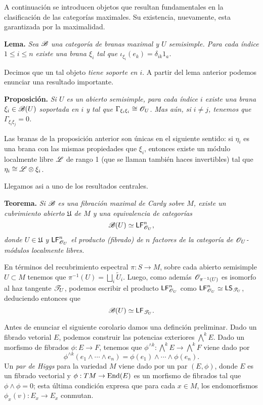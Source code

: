 {A continuaci\'on se introducen objetos que resultan fundamentales en la clasificaci\'on de las categor\'ias maximales. Su existencia, nuevamente, esta garantizada por la maximalidad.
\medskip

{\bf Lema.} {\it Sea $\mathscr{B}$ una categor\'ia de branas maximal y $U$ semisimple. Para cada \'indice $1\leqslant i \leqslant n$ existe una brana $\xi_i$ tal que $\iota_{\xi_i}(e_k)=\delta_{ik}1_a$.}

Decimos que un tal objeto \emph{tiene soporte en $i$}. A partir del lema anterior podemos enunciar una resultado importante.
\medskip

{\bf Proposici\'on.} {\it Si $U$ es un abierto semisimple, para cada \'indice $i$ existe una brana $\xi_i\in \mathscr{B}(U)$ soportada en $i$ y tal que $\Gamma_{\xi_i\xi_i}\cong \mathscr{O}_U$. Mas a\'un, si $i\neq j$, tenemos que $\Gamma_{\xi_i\xi_j}=0$.}

Las branas de la proposici\'on anterior son \'unicas en el siguiente sentido: si $\eta_i$ es una brana con las mismas propiedades que $\xi_i$, entonces existe un m\'odulo localmente libre $\mathscr{L}$ de rango 1 (que se llaman tambi\'en haces invertibles) tal que $\eta_i\cong \mathscr{L}\otimes \xi_i$.

Llegamos asi a uno de los resultados centrales.
\medskip

{\bf Teorema.} {\it Si $\mathscr{B}$ es una fibraci\'on maximal de Cardy sobre $M$, existe un cubrimiento abierto $\mathfrak{U}$ de $M$ y una equivalencia de categor\'ias
$$\mathscr{B}(U)\simeq \mathsf{LF}^n_{\mathscr{O}_U},$$
donde $U\in \mathfrak{U}$ y $\mathsf{LF}^n_{\mathscr{O}_U}$ el producto (fibrado) de $n$ factores de la categor\'ia de $\mathscr{O}_U$-m\'odulos localmente libres.}
\medskip

En t\'erminos del recubrimiento espectral $\pi :S\to M$, sobre cada abierto semisimple $U\subset M$ tenemos que $\pi^{-1}(U)=\bigsqcup_i\widetilde{U}_i$. Luego, como adem\'as $\mathscr{O}_{\pi^{-1}(U)}$ es isomorfo al haz tangente $\mathscr{T}_U$, podemos escribir el producto $\mathsf{LF}^n_{\mathscr{O}_U}$ como $\mathsf{LF}^n_{\mathscr{O}_U}\simeq \mathsf{LS}_{\mathscr{T}_U}$, deduciendo entonces que
$$\mathscr{B}(U)\simeq \mathsf{LF}_{\mathscr{T}_U}.$$

Antes de enunciar el siguiente corolario damos una definci\'on preliminar. Dado un fibrado vetorial $E$, podemos construir las potencias exteriores $\bigwedge^kE$. Dado un morfismo de fibrados $\phi :E\to F$, tenemos que $\phi^{\wedge k}:\bigwedge^kE\to \bigwedge^kF$ viene dado por
$$\phi^{\wedge k}(e_1\wedge \cdots \wedge e_n)=\phi (e_1)\wedge \cdots \wedge \phi (e_n).$$
Un \emph{par de Higgs} para la variedad $M$ viene dado por un par $(E,\phi )$, donde $E$ es un fibrado vectorial y $\phi :TM\to \operatorname{End}(E)$ es un morfismo de fibrados tal que $\phi \wedge \phi =0$; esta \'ultima condici\'on expresa que para cada $x\in M$, los endomorfismos $\phi_x(v):E_x\to E_x$ conmutan.
\medskip

}
